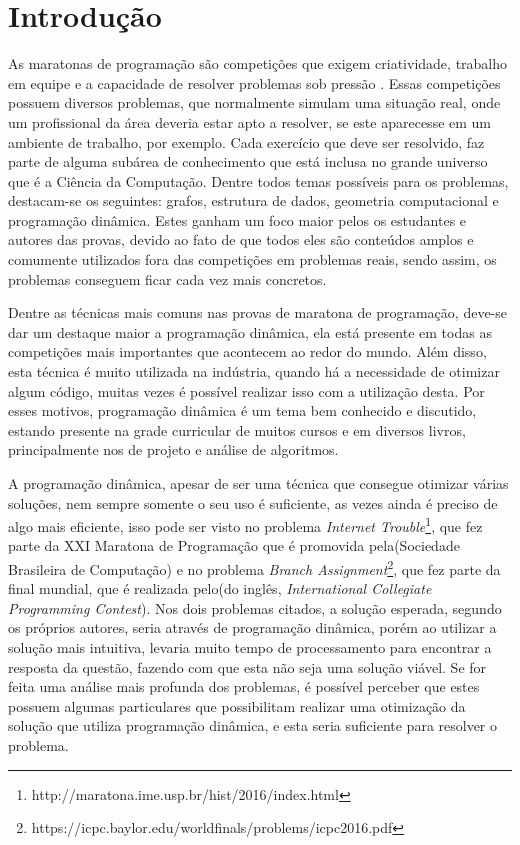 \chapter{Introdu\c{c}\~ao}
\label{chap:introducao}
As maratonas de programação são competições que exigem criatividade, trabalho em equipe e a capacidade de resolver problemas sob pressão \cite{Piekarski2015}. Essas competições possuem diversos problemas, que normalmente simulam uma situação real, onde um profissional da área deveria estar apto a resolver, se este aparecesse em um ambiente de trabalho, por exemplo. Cada exercício que deve ser resolvido, faz parte de alguma subárea de conhecimento que está inclusa no grande universo que é a Ciência da Computação. Dentre todos temas possíveis para os problemas, destacam-se os seguintes: grafos, estrutura de dados, geometria computacional e programação dinâmica. Estes ganham um foco maior pelos os estudantes e autores das provas, devido ao fato de que todos eles são conteúdos amplos e comumente utilizados fora das competições em problemas reais, sendo assim, os problemas conseguem ficar cada vez mais concretos.

Dentre as técnicas mais comuns nas provas de maratona de programação, deve-se dar um destaque maior a programação dinâmica, ela está presente em todas as competições mais importantes que acontecem ao redor do mundo. Além disso, esta técnica é muito utilizada na indústria, quando há a necessidade de otimizar algum código, muitas vezes é possível realizar isso com a utilização desta. Por esses motivos, programação dinâmica é um tema bem conhecido e discutido, estando presente na grade curricular de muitos cursos e em diversos livros, principalmente nos de projeto e análise de algoritmos.

A programação dinâmica, apesar de ser uma técnica que consegue otimizar várias soluções, nem sempre somente o seu uso é suficiente, as vezes ainda é preciso de algo mais eficiente, isso pode ser visto no problema \textit{Internet Trouble}\footnote{http://maratona.ime.usp.br/hist/2016/index.html}, que fez parte da XXI Maratona de Programação que é promovida pela(Sociedade Brasileira de Computação) e no problema \textit{Branch Assignment}\footnote{https://icpc.baylor.edu/worldfinals/problems/icpc2016.pdf}, que fez parte da final mundial, que é realizada pelo(do inglês, \textit{International Collegiate Programming Contest}). Nos dois problemas citados, a solução esperada, segundo os próprios autores, seria através de programação dinâmica, porém ao utilizar a solução mais intuitiva, levaria muito tempo de processamento para encontrar a resposta da questão, fazendo com que esta não seja uma solução viável. Se for feita uma análise mais profunda dos problemas, é possível perceber que estes possuem algumas particulares que possibilitam realizar uma otimização da solução que utiliza programação dinâmica, e esta seria suficiente para resolver o problema.

